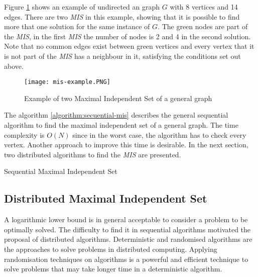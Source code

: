 Figure \ref{fig:graph1} shows an example of undirected an graph $G$ with 8 vertices and 14 edges. There are two \textit{MIS} in this example, showing that it is possible to find more that one solution for the same instance of $G$. The green nodes are part of the \textit{MIS}, in the first \textit{MIS} the number of nodes is 2 and 4 in the second solution. Note that no common edges exist between green vertices and every vertex that it is not part of the \textit{MIS} has a neighbour in it, satisfying the conditions set out above.
 
\begin{figure}[ht]
\centering
\texttt{[image: mis-example.PNG]} 
\caption{Example of two Maximal Independent Set of a general graph}
\label{fig:graph1}
\end{figure}



The algorithm \ref{algorithm:secuential-mis} describes the general sequential algorithm to find the maximal independent set of a general graph. The time complexity is $O(N)$ since in the worst case, the algorithm has to check every vertex. Another approach to improve this time is desirable. In the next section, two distributed algorithms to find the \textit{MIS} are presented.



\begin{algorithm}
 \caption{Sequential Maximal Independent Set}
 \label{algorithm:secuential-mis} 

\SetAlgoNoLine
{}
    
 
\end{algorithm}
 
 
\subsection{Distributed Maximal Independent Set}

A logarithmic lower bound is in general acceptable to consider a problem to be optimally solved. The difficulty to find it in sequential algorithms motivated the proposal of distributed algorithms. Deterministic and randomised algorithms are the approaches to solve problems in distributed computing.  Applying randomisation techniques on algorithms is a powerful and efficient technique to solve problems that may take longer time in a deterministic algorithm.

